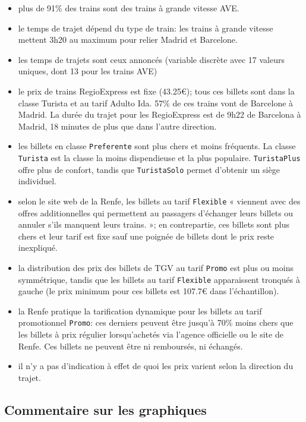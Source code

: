 \documentclass[
  11pt,
  letterpaper,
]{scrbook}
\providecommand{\tightlist}{%
  \setlength{\itemsep}{0pt}\setlength{\parskip}{0pt}}\usepackage{longtable,booktabs,array}
\theoremstyle{definition}
\theoremstyle{remark}
\begin{document}
\begin{itemize}
\tightlist
\item
  plus de 91\% des trains sont des trains à grande vitesse AVE.
\item
  le temps de trajet dépend du type de train: les trains à grande
  vitesse mettent 3h20 au maximum pour relier Madrid et Barcelone.
\item
  les temps de trajets sont ceux annoncés (variable discrète avec 17
  valeurs uniques, dont 13 pour les trains AVE)
\item
  le prix de trains RegioExpress est fixe (43.25€); tous ces billets
  sont dans la classe Turista et au tarif Adulto Ida. 57\% de ces trains
  vont de Barcelone à Madrid. La durée du trajet pour les RegioExpress
  est de 9h22 de Barcelona à Madrid, 18 minutes de plus que dans l'autre
  direction.
\item
  les billets en classe \texttt{Preferente} sont plus chers et moins
  fréquents. La classe \texttt{Turista} est la classe la moins
  dispendieuse et la plus populaire. \texttt{TuristaPlus} offre plus de
  confort, tandis que \texttt{TuristaSolo} permet d'obtenir un siège
  individuel.
\item
  selon le site web de la Renfe, les billets au tarif \texttt{Flexible}
  « viennent avec des offres additionnelles qui permettent au passagers
  d'échanger leurs billets ou annuler s'ils manquent leurs trains. »; en
  contrepartie, ces billets sont plus chers et leur tarif est fixe sauf
  une poignée de billets dont le prix reste inexpliqué.
\item
  la distribution des prix des billets de TGV au tarif \texttt{Promo}
  est plus ou moins symmétrique, tandis que les billets au tarif
  \texttt{Flexible} apparaissent tronqués à gauche (le prix minimum pour
  ces billets est 107.7€ dans l'échantillon).
\item
  la Renfe pratique la tarification dynamique pour les billets au tarif
  promotionnel \texttt{Promo}: ces derniers peuvent être jusqu'à 70\%
  moins chers que les billets à prix régulier lorsqu'achetés via
  l'agence officielle ou le site de Renfe. Ces billets ne peuvent être
  ni remboursés, ni échangés.
\item
  il n'y a pas d'indication à effet de quoi les prix varient selon la
  direction du trajet.
\end{itemize}

\hypertarget{commentaire-sur-les-graphiques}{%
\subsection{Commentaire sur les
graphiques}\label{commentaire-sur-les-graphiques}}
\end{document}
